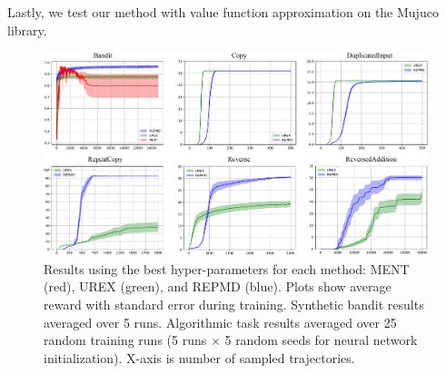 Lastly, we test our method with value function approximation on the Mujuco library.


%
%

\begin{figure}[t]
\begin{center}
\includegraphics[width=0.85\linewidth]{./fig1.pdf}
\end{center}
\caption{
Results using the best hyper-parameters for each method: MENT (red), UREX (green), and REPMD (blue).
Plots show average reward with standard error during training. Synthetic bandit results averaged over 5 runs. Algorithmic task results averaged over 25 random training runs (5 runs $\times$ 5 random seeds for neural network initialization). X-axis is number of sampled trajectories. } 
\label{fig:results}
\end{figure}

